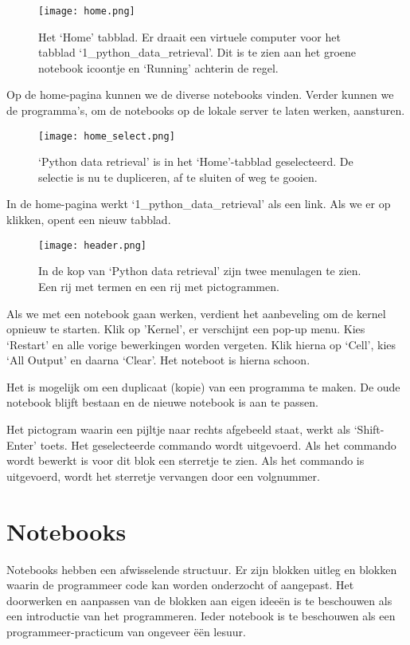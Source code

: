 \begin{figure}[H]
\texttt{[image: home.png]}
\caption{Het `Home' tabblad. Er draait een virtuele computer voor het tabblad `1\_python\_data\_retrieval'. Dit is te zien
aan het groene notebook icoontje en `Running' achterin de regel.}
\end{figure}

Op de home-pagina kunnen we de diverse notebooks vinden. Verder kunnen we de programma's, om de notebooks op de lokale server te laten werken, aansturen.

\begin{figure}[H]
\texttt{[image: home\_select.png]}
\caption{`Python data retrieval' is in het `Home'-tabblad geselecteerd. De selectie is nu te dupliceren, af te sluiten of weg te gooien.}
\end{figure}

In de home-pagina werkt `1\_python\_data\_retrieval' als een link. Als we er op klikken, opent een nieuw tabblad.

\begin{figure}[H]
\texttt{[image: header.png]}
\caption{In de kop van `Python data retrieval' zijn twee menulagen te zien. Een rij met termen en een rij met pictogrammen.}
\end{figure}

Als we met een notebook gaan werken, verdient het aanbeveling om de kernel opnieuw te starten. Klik op 'Kernel', er verschijnt een pop-up menu. Kies `Restart' en alle vorige bewerkingen worden vergeten. Klik hierna op `Cell', kies `All Output' en daarna `Clear'. Het noteboot is hierna schoon.

Het is mogelijk om een duplicaat (kopie) van een programma te maken. De oude notebook blijft bestaan en de nieuwe notebook is aan te passen. 

Het pictogram waarin een pijltje naar rechts afgebeeld staat, werkt als `Shift-Enter' toets. Het geselecteerde commando wordt uitgevoerd. Als het commando wordt bewerkt is voor dit blok een sterretje te zien. Als het commando is uitgevoerd, wordt het sterretje vervangen door een volgnummer.

\section{Notebooks}

Notebooks hebben een afwisselende structuur. Er zijn blokken uitleg en blokken waarin de programmeer code kan worden onderzocht of aangepast. Het doorwerken en aanpassen van de blokken aan eigen idee\"{e}n is te beschouwen als een introductie van het programmeren. Ieder notebook is te beschouwen als een programmeer-practicum van ongeveer \"{e}\"{e}n lesuur.
 
